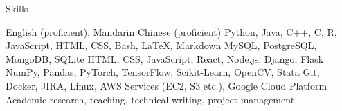 \begin{rubric}{Skills}

\entry*[Languages]
    English (proficient), Mandarin Chinese (proficient)
    Python, Java, C++, C, R, JavaScript, HTML, CSS, Bash, LaTeX, Markdown
\entry*[Databases]
    MySQL, PostgreSQL, MongoDB, SQLite
    HTML, CSS, JavaScript, React, Node.js, Django, Flask
    NumPy, Pandas, PyTorch, TensorFlow, Scikit-Learn, OpenCV, Stata
    Git, Docker, JIRA, Linux, AWS Services (EC2, S3 etc.), Google Cloud Platform
    Academic research, teaching, technical writing, project management

\end{rubric}
